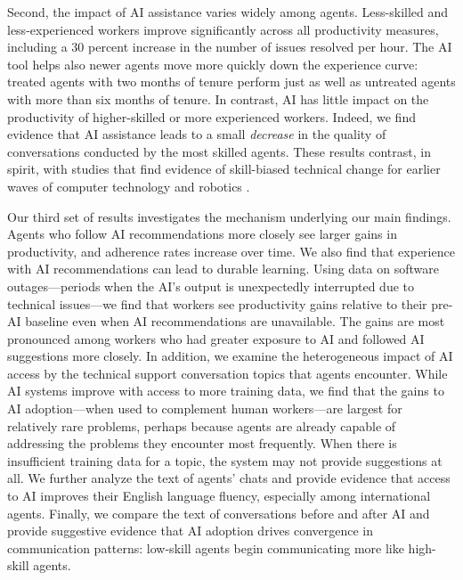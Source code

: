\documentclass[11pt]{article}
\begin{document}
Second, the impact of AI assistance varies widely among agents.  Less-skilled and less-experienced workers improve significantly across all productivity measures, including a 30 percent increase in the number of issues resolved per hour.  The AI tool helps also newer agents move more quickly down the experience curve: treated agents with two months of tenure perform just as well as untreated agents with more than six months of tenure.  In contrast, AI has little impact on the productivity of higher-skilled or more experienced workers.  Indeed, we find evidence that AI assistance leads to a small \textit{decrease} in the quality of conversations conducted by the most skilled agents.  These results contrast, in spirit, with studies that find evidence of skill-biased technical change for earlier waves of computer technology and robotics \citep{bres2002, bartel2007, dixon2020}. 

Our third set of results investigates the mechanism underlying our main findings. Agents who follow AI recommendations more closely see larger gains in productivity, and adherence rates increase over time.  We also find that experience with AI recommendations can lead to durable learning. Using data on software outages---periods when the AI's output is unexpectedly interrupted due to technical issues---we find that workers see productivity gains relative to their pre-AI baseline even when AI recommendations are unavailable.  The gains are most pronounced among workers who had greater exposure to AI and followed AI suggestions more closely. In addition, we examine the heterogeneous impact of AI access by the technical support conversation topics that agents encounter.  While AI systems improve with access to more training data, we find that the gains to AI adoption---when used to complement human workers---are largest for relatively rare problems, perhaps because agents are already capable of addressing the problems they encounter most frequently. When there is insufficient training data for a topic, the system may not provide suggestions at all.  We further analyze the text of agents' chats and provide evidence that access to AI improves their English language fluency, especially among international agents.  Finally, we compare the text of conversations before and after AI and provide suggestive evidence that AI adoption drives convergence in communication patterns: low-skill agents begin communicating more like high-skill agents.
\end{document}
